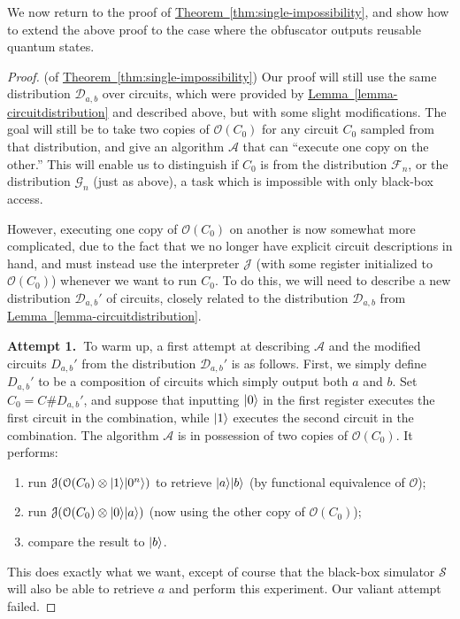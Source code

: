 \documentclass[11pt]{article}
\numberwithin{equation}{section}
\newcommand{\expref}[2]{\texorpdfstring{\hyperref[#2]{#1~\ref{#2}}}{#1~\ref{#2}}}
\newcommand{\algo}{\mathcal}
\begin{document}
{We now return to the proof of \expref{Theorem}{thm:single-impossibility}, and show how to extend the above proof to the case where the obfuscator outputs reusable quantum states.

\begin{proof} (of \expref{Theorem}{thm:single-impossibility})
Our proof will still use the same distribution $\mathcal D_{a, b}$ over circuits, which were provided by \expref{Lemma}{lemma-circuitdistribution} and described above, but with some slight modifications. The goal will still be to take two copies of $\algo O(C_0)$ for any circuit $C_0$ sampled from that distribution, and give an algorithm $\algo A$ that can ``execute one copy on the other.'' This will enable us to distinguish if $C_0$ is from the distribution $\mathcal F_n$, or the distribution $\mathcal G_n$ (just as above), a task which is impossible with only black-box access.

However, executing one copy of $\algo O(C_0)$ on another is now somewhat more complicated, due to the fact that we no longer have explicit circuit descriptions in hand, and must instead use the interpreter $\algo J$ (with some register initialized to $\algo O(C_0)$) whenever we want to run $C_0$. To do this, we will need to describe a new distribution $\mathcal D_{a, b}'$ of circuits, closely related to the distribution $\mathcal D_{a, b}$ from \expref{Lemma}{lemma-circuitdistribution}.

\textbf{Attempt 1.~}To warm up, a first attempt at describing $\algo A$ and the modified circuits $D_{a, b}'$ from the distribution $\mathcal D_{a, b}'$ is as follows. First, we simply define $D_{a, b}'$ to be a composition of circuits which simply output both $a$ and $b$. Set $C_0 = C \# D_{a, b}'$, and suppose that inputting ${\left\vert{0}\right\rangle}$ in the first register executes the first circuit in the combination, while ${\left\vert{1}\right\rangle}$ executes the second circuit in the combination. The algorithm $\algo A$ is in possession of two copies of $\algo O(C_0)$. It performs:
\begin{enumerate}
\item run $\algo J ( \algo O(C_0) \otimes \ket{1} \ket{0^n})$ to retrieve ${\left\vert{a}\right\rangle} {\left\vert{b}\right\rangle}$ (by functional equivalence of $\algo O$);
\item run $\algo J( \algo O(C_0) \otimes \ket{0} \ket{a})$ (now using the other copy of $\algo O(C_0)$);
\item compare the result to ${\left\vert{b}\right\rangle}$.
\end{enumerate}
This does exactly what we want, except of course that the black-box simulator $\algo S$ will also be able to retrieve $a$ and perform this experiment. Our valiant attempt failed.


\end{proof}}
\end{document}
